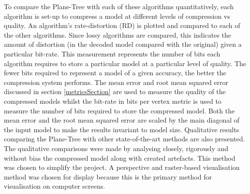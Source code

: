 To compare the Plane-Tree with each of these algorithms quantitatively, each algorithm is set-up to compress a model at different levels of compression vs quality. An algorithm's rate-distortion (RD) is plotted and compared to each of the other algorithms. Since lossy algorithms are compared, this indicates the amount of distortion (in the decoded model compared with the original) given a particular bit-rate. This measurement represents the number of bits each algorithm requires to store a particular model at a particular level of quality. The fewer bits required to represent a model of a given accuracy, the better the compression system performs. The mean error and root mean squared error discussed in section \ref{metricsSection} are used to measure the quality of the compressed models whilst the bit-rate in bits per vertex metric is used to measure the number of bits required to store the compressed model. Both the mean error and the root mean squared error are scaled by the main diagonal of the input model to make the results invariant to model size. Qualitative results comparing the Plane-Tree with other state-of-the-art methods are also presented. The qualitative comparisons were made by analysing closely, rigorously and without bias the compressed model along with created artefacts. This method was chosen to simplify the project. A perspective and raster-based visualisation method was chosen for display because this is the primary method for visualisation on computer screens. \\

